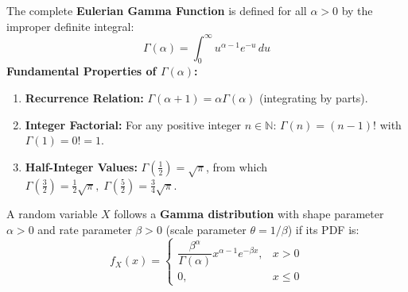\documentclass[12pt,a4paper]{article}
\begin{document}
\begin{tcolorbox}[defbox, title={\textbf{Definition: The Gamma Function $\Gamma(\alpha)$}}]
The complete \textbf{Eulerian Gamma Function} is defined for all $\alpha > 0$ by the improper definite integral:
\begin{equation}
  \Gamma(\alpha) = \int_0^\infty u^{\alpha - 1} e^{-u} \, du
\end{equation}
\textbf{Fundamental Properties of $\Gamma(\alpha)$:}
\begin{enumerate}[leftmargin=*, itemsep=2pt]
  \item \textbf{Recurrence Relation:} $\Gamma(\alpha + 1) = \alpha \Gamma(\alpha)$ (integrating by parts).
  \item \textbf{Integer Factorial:} For any positive integer $n \in \mathbb{N}$: $\Gamma(n) = (n - 1)!$ with $\Gamma(1) = 0! = 1$.
  \item \textbf{Half-Integer Values:} $\Gamma\left(\frac{1}{2}\right) = \sqrt{\pi}$, from which $\Gamma\left(\frac{3}{2}\right) = \frac{1}{2}\sqrt{\pi}, \; \Gamma\left(\frac{5}{2}\right) = \frac{3}{4}\sqrt{\pi}$.
\end{enumerate}
\end{tcolorbox}

\begin{tcolorbox}[formulabox, title={\textbf{Two-Parameter Gamma Density $\operatorname{Gamma}(\alpha,\beta)$}}]
A random variable $X$ follows a \textbf{Gamma distribution} with shape parameter $\alpha > 0$ and rate parameter $\beta > 0$ (scale parameter $\theta = 1/\beta$) if its PDF is:
\begin{equation}
  f_X(x) =
  \begin{cases}
    \dfrac{\beta^\alpha}{\Gamma(\alpha)} x^{\alpha - 1} e^{-\beta x}, & x > 0 \\[8pt]
    0, & x \le 0
  \end{cases}
\end{equation}
\end{tcolorbox}
\end{document}

